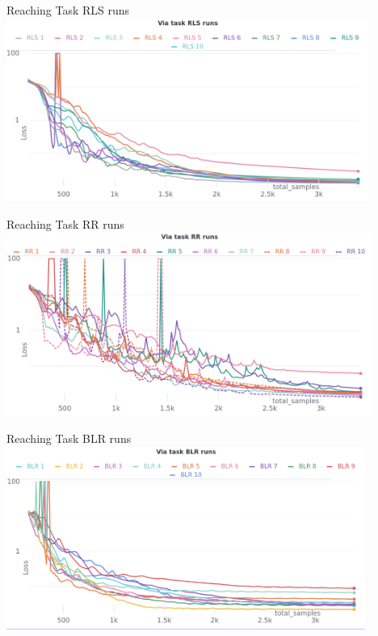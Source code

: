 \documentclass[navbarinfooter, 12pt]{sdqbeamer}
\begin{document}
\begin{frame}{Reaching Task RLS runs}
  \centering
  \includegraphics[height=6cm]{figures/via_rls_runs.png}
\end{frame}

\begin{frame}{Reaching Task RR runs}
  \centering
  \includegraphics[height=6cm]{figures/via_rr_runs.png}
\end{frame}

\begin{frame}{Reaching Task BLR runs}
  \centering
  \includegraphics[height=6cm]{figures/via_blr_runs.png}
\end{frame}
\end{document}

